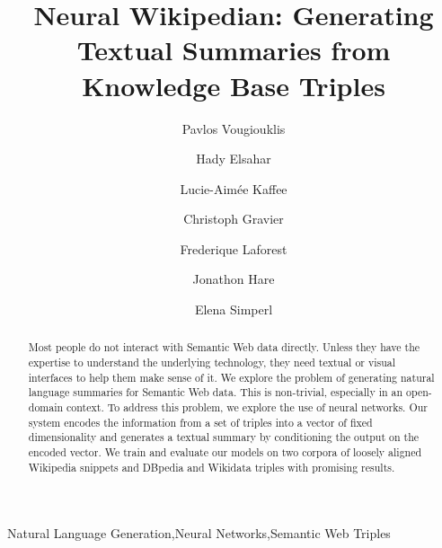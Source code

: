 \documentclass[preprint,5p]{elsarticle}
\begin{document}
\begin{frontmatter}

\title{Neural Wikipedian: Generating Textual Summaries from Knowledge Base Triples}

\author[soton]{Pavlos Vougiouklis}
\author[ujm]{Hady Elsahar}
\author[soton]{Lucie-Aim\'{e}e Kaffee}
\author[ujm]{Christoph Gravier}
\author[ujm]{Frederique Laforest}
\author[soton]{Jonathon Hare}
\author[soton]{Elena Simperl}

\address[soton]{School of Electronics and Computer Science\\
  University of Southampton\\
  Southampton, United Kingdom}
\address[ujm]{Laboratoire Hubert Curien, CNRS\\
  UJM-Saint-\'{E}tienne\\
  Universit\'{e} de Lyon,\\
  Lyon, France}











\begin{abstract}
  Most people do not interact with Semantic Web data directly. Unless they have the expertise to understand the underlying technology, they need textual or visual interfaces to help them make sense of it. We explore the problem of generating natural language summaries for Semantic Web data. This is non-trivial, especially in an open-domain context. To address this problem, we explore the use of neural networks. Our system encodes the information from a set of triples into a vector of fixed dimensionality and generates a textual summary by conditioning the output on the encoded vector. We train and evaluate our models on two corpora of loosely aligned Wikipedia snippets and DBpedia and Wikidata triples with promising results.
\end{abstract}

\begin{keyword}
Natural Language Generation\sep Neural Networks\sep Semantic Web Triples
\end{keyword}

\end{frontmatter}
\end{document}

